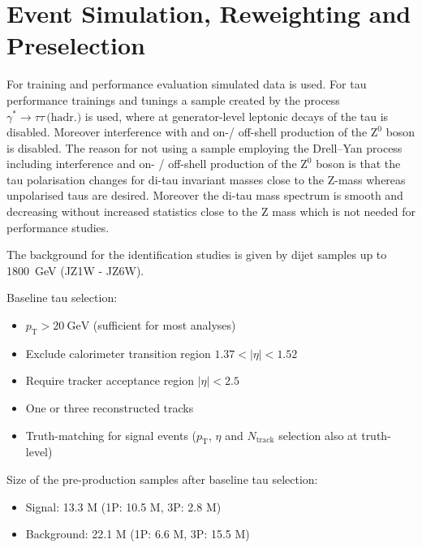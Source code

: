 \section{Event Simulation, Reweighting and Preselection}
\label{sec:bdt_eventsim}

For training and performance evaluation simulated data is used. For tau
performance trainings and tunings a sample created by the process
$\gamma^* \rightarrow \tau \tau \, \text{(hadr.)}$ is used, where at
generator-level leptonic decays of the tau is disabled. Moreover interference
with and on-/ off-shell production of the $\mathrm{Z}^0$ boson is disabled. The
reason for not using a sample employing the Drell--Yan process including
interference and on- / off-shell production of the $\mathrm{Z}^0$ boson is that
the tau polarisation changes for di-tau invariant masses close to the
$\mathrm{Z}$-mass whereas unpolarised taus are desired. Moreover the di-tau mass
spectrum is smooth and decreasing without increased statistics close to the
$\mathrm{Z}$ mass which is not needed for performance studies.

The background for the identification studies is given by dijet samples up to
\SI{1800}{\giga\electronvolt} (JZ1W - JZ6W). 

Baseline tau selection:
\begin{itemize}
\item $p_\text{T} > \SI{20}{\giga\electronvolt}$ (sufficient for most analyses)
\item Exclude calorimeter transition region $1.37 < |\eta| < 1.52$
\item Require tracker acceptance region $|\eta| < 2.5$
\item One or three reconstructed tracks
\item Truth-matching for signal events ($p_\text{T}$, $\eta$ and
  $N_\text{track}$ selection also at truth-level)
\end{itemize}

Size of the pre-production samples after baseline tau selection:
\begin{itemize}
\item Signal: 13.3 M (1P: 10.5 M, 3P: 2.8 M)
\item Background: 22.1 M (1P: 6.6 M, 3P: 15.5 M)
\end{itemize}


